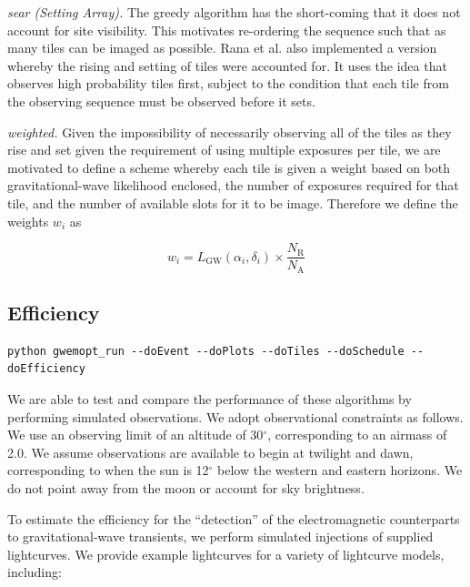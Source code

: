 \documentclass[twocolumn]{aastex61}
\begin{document}
\emph{sear (Setting Array).} The greedy algorithm has the short-coming that it does not account for site visibility. This motivates re-ordering the sequence such that as many tiles can be imaged as possible.
Rana et al. \cite{RaSi2017} also implemented a version whereby the rising and setting of tiles were accounted for. It uses the idea that observes high probability tiles first, subject to the condition that each tile from the
observing sequence must be observed before it sets.

\emph{weighted.} Given the impossibility of necessarily observing all of the tiles as they rise and set given the requirement of using multiple exposures per tile, we are motivated to define a scheme whereby each tile is given a weight based on both gravitational-wave likelihood enclosed, the number of exposures required for that tile, and the number of available slots for it to be image. Therefore we define the weights $w_i$ as

\begin{equation}
w_i = L_\textrm{GW}(\alpha_i,\delta_i) \times \frac{N_\textrm{R}}{N_\textrm{A}} 
\end{equation}

\subsection{Efficiency}
\begin{lstlisting}
python gwemopt_run --doEvent --doPlots --doTiles --doSchedule --doEfficiency
\end{lstlisting}
We are able to test and compare the performance of these algorithms by performing simulated observations. 
We adopt observational constraints as follows. 
We use an observing limit of an altitude of 30$^\circ$, corresponding to an airmass of 2.0. 
We assume observations are available to begin at twilight and dawn, corresponding to when the sun is 12$^\circ$ below the western and eastern horizons.
We do not point away from the moon or account for sky brightness.

To estimate the efficiency for the ``detection'' of the electromagnetic counterparts to gravitational-wave transients, we perform simulated injections of supplied lightcurves. We provide example lightcurves for a variety of lightcurve models, including:
\end{document}
